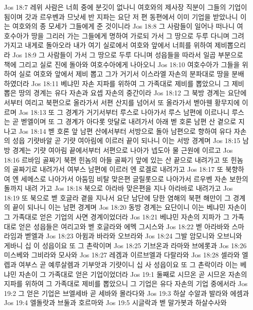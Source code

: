 Jos 18:7  레위 사람은 너희 중에 분깃이 없나니 여호와의 제사장 직분이 그들의 기업이 됨이며 갓과 르우벤과 므낫세 반 지파는 요단 저 편 동편에서 이미 기업을 받았나니 이는 여호와의 종 모세가 그들에게 준 것이니라
Jos 18:8  그 사람들이 일어나 떠나니 여호수아가 땅을 그리러 가는 그들에게 명하여 가로되 가서 그 땅으로 두루 다니며 그려가지고 내게로 돌아오라 내가 여기 실로에서 여호와 앞에서 너희를 위하여 제비뽑으리라
Jos 18:9  그 사람들이 가서 그 땅으로 두루 다니며 성읍들을 따라서 일곱 부분으로 책에 그리고 실로 진에 돌아와 여호수아에게 나아오니
Jos 18:10  여호수아가 그들을 위하여 실로 여호와 앞에서 제비 뽑고 그가 거기서 이스라엘 자손의 분파대로 땅을 분배하였더라
Jos 18:11  베냐민 자손 지파를 위하여 그 가족대로 제비를 뽑았으니 그 제비뽑은 땅의 경계는 유다 자손과 요셉 자손의 중간이라
Jos 18:12  그 북방 경계는 요단에서부터 여리고 북편으로 올라가서 서편 산지를 넘어서 또 올라가서 벧아웬 황무지에 이르며
Jos 18:13  또 그 경계가 거기서부터 루스로 나아가서 루스 남편에 이르나니 루스는 곧 벧엘이며 또 그 경계가 아다롯 앗달로 내려가서 아래 벧 호론 남편 산 곁으로 지나고
Jos 18:14  벧 호론 앞 남편 산에서부터 서방으로 돌아 남편으로 향하여 유다 자손의 성읍 기럇바알 곧 기럇 여아림에 이르러 끝이 되나니 이는 서방 경계며
Jos 18:15  남방 경계는 기럇 여아림 끝에서부터 서편으로 나아가 넵도아 물 근원에 이르고
Jos 18:16  르바임 골짜기 북편 힌놈의 아들 골짜기 앞에 있는 산 끝으로 내려가고 또 힌놈의 골짜기로 내려가서 여부스 남편에 이르러 엔 로겔로 내려가고
Jos 18:17  또 북향하여 엔 세메스로 나아가서 아둠밈 비탈 맞은편 글릴롯으로 나아가서 르우벤 자손 보한의 돌까지 내려 가고
Jos 18:18  북으로 아라바 맞은편을 지나 아라바로 내려가고
Jos 18:19  또 북으로 벧 호글라 곁을 지나서 요단 남단에 당한 염해의 북편 해만이 그 경계의 끝이 되나니 이는 남편 경계며
Jos 18:20  동방 경계는 요단이니 이는 베냐민 자손이 그 가족대로 얻은 기업의 사면 경계이었더라
Jos 18:21  베냐민 자손의 지파가 그 가족대로 얻은 성읍들은 여리고와 벧 호글라와 에멕 그시스와
Jos 18:22  벧 아라바와 스마라임과 벧엘과
Jos 18:23  아윔과 바라와 오브라와
Jos 18:24  그발 암모니와 오브니와 게바니 십 이 성읍이요 또 그 촌락이며
Jos 18:25  기브온과 라마와 브에롯과
Jos 18:26  미스베와 그비라와 모사와
Jos 18:27  레겜과 이르브엘과 다랄라와
Jos 18:28  셀라와 엘렙과 여부스 곧 예루살렘과 기부앗과 기럇이니 십 사 성읍이요 또 그 촌락이라 이는 베냐민 자손이 그 가족대로 얻은 기업이었더라
Jos 19:1  둘째로 시므온 곧 시므온 자손의 지파를 위하여 그 가족대로 제비를 뽑았으니 그 기업은 유다 자손의 기업 중에서라
Jos 19:2  그 얻은 기업은 브엘세바 곧 세바와 몰라다와
Jos 19:3  하살 수알과 발라와 에셈과
Jos 19:4  엘돌랏과 브둘과 호르마와
Jos 19:5  시글락과 벧 말가봇과 하살수사와
